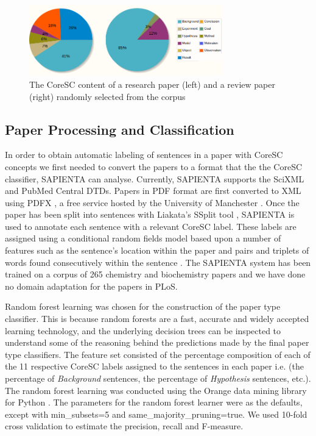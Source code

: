 \documentclass{svmult}
\begin{document}
\begin{figure}[t]
\centering
\includegraphics[width=0.75\textwidth]{figures/corescs.png}
\caption{The CoreSC content of a research paper (left) and a review paper (right) randomly selected from the corpus}
\label{fig:coresc_pies} 
\end{figure}

\subsection*{Paper Processing and Classification}

In order to obtain automatic labeling of sentences in a paper with CoreSC
concepts we first needed to convert the papers to a format that the the CoreSC
classifier, SAPIENTA can analyse.  Currently, SAPIENTA supports the SciXML and
PubMed Central DTDs.  Papers in PDF format are first converted to XML using
PDFX , a free service hosted by the University of Manchester
\cite{Constantin2013}. Once the paper has been split into sentences with
Liakata's SSplit tool \cite{liakata2009semantic}, SAPIENTA is used to annotate
each sentence with a relevant CoreSC label. These labels are assigned using a
conditional random fields model based upon a number of features such as the
sentence's location within the paper and pairs and triplets of words found
consecutively within the sentence \cite{Liakata2012}.  The SAPIENTA system has
been trained on a corpus of 265 chemistry and biochemistry papers and we have
done no domain adaptation for the papers in PLoS.






Random forest learning \cite{Breiman2001} was chosen for the construction of the
paper type classifier. This is because random forests are a fast, accurate and
widely accepted learning technology, and the underlying decision trees can be
inspected to understand some of the reasoning behind the predictions made by
the final paper type classifiers. The feature set consisted of the percentage
composition of each of the 11 respective CoreSC labels assigned to the
sentences in each paper i.e. (the percentage of {\em Background} sentences, the
percentage of {\em Hypothesis} sentences, etc.). The random forest learning was
conducted using the Orange data mining library for Python \cite{Curk2005}.  The
parameters for the random forest learner were as the defaults, except with
min\_subsets=5 and same\_majority\_pruning=true.  We used 10-fold cross
validation to estimate the precision, recall and F-measure.
\end{document}
